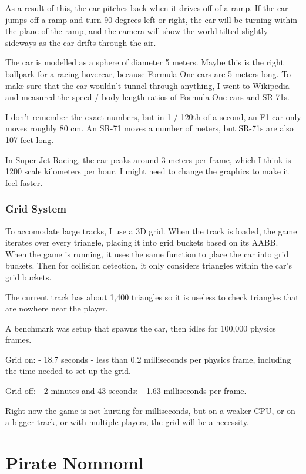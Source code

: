 \documentclass[]{book}
\begin{document}
As a result of this, the car pitches back when it drives off of a ramp.
If the car jumps off a ramp and turn 90 degrees left or right, the car
will be turning within the plane of the ramp, and the camera will show
the world tilted slightly sideways as the car drifts through the air.

The car is modelled as a sphere of diameter 5 meters. Maybe this is the
right ballpark for a racing hovercar, because Formula One cars are 5
meters long. To make sure that the car wouldn't tunnel through anything,
I went to Wikipedia and measured the speed / body length ratios of
Formula One cars and SR-71s.

I don't remember the exact numbers, but in 1 / 120th of a second, an F1
car only moves roughly 80 cm. An SR-71 moves a number of meters, but
SR-71s are also 107 feet long.

In Super Jet Racing, the car peaks around 3 meters per frame, which I
think is 1200 scale kilometers per hour. I might need to change the
graphics to make it feel faster.

\subsection{Grid System}\label{grid-system}

To accomodate large tracks, I use a 3D grid. When the track is loaded,
the game iterates over every triangle, placing it into grid buckets
based on its AABB. When the game is running, it uses the same function
to place the car into grid buckets. Then for collision detection, it
only considers triangles within the car's grid buckets.

The current track has about 1,400 triangles so it is useless to check
triangles that are nowhere near the player.

A benchmark was setup that spawns the car, then idles for 100,000
physics frames.

Grid on: - 18.7 seconds - less than 0.2 milliseconds per physics frame,
including the time needed to set up the grid.

Grid off: - 2 minutes and 43 seconds: - 1.63 milliseconds per frame.

Right now the game is not hurting for milliseconds, but on a weaker CPU,
or on a bigger track, or with multiple players, the grid will be a
necessity.

\chapter{Pirate Nomnoml}\label{pirate-nomnoml}
\end{document}
